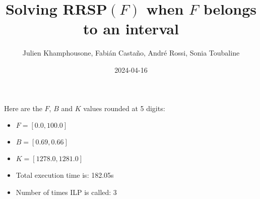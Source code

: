 \documentclass{article}
\begin{document}
     \title{Solving RRSP$(F)$ when $F$ belongs to an interval}
     \author{Julien Khamphousone, Fabi\'an Casta\~no, Andr\'e Rossi, Sonia Toubaline}
     \date{2024-04-16}
     \maketitle
     \def\F{{0.0,1.0,1.1}}
\def\gF{{12.78,13.47,1281.66}}

    Here are the $F$, $B$ and $K$ values rounded at 5 digits:

\begin{itemize}
	\item  $F = [0.0,100.0]$
 \item $B = [0.69,0.66]$
 \item  $K = [1278.0,1281.0]$\item Total execution time is: 182.05s\item Number of times ILP is called: 3\end{itemize}
\end{document}
